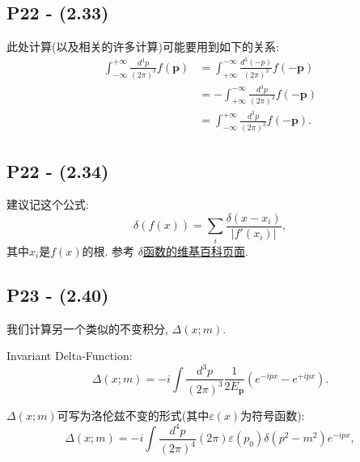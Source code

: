 \documentclass[10pt,b5paper,openany]{book}
\begin{document}
\subsection{P22 - (2.33)}

此处计算(以及相关的许多计算)可能要用到如下的关系: 
\begin{equation}
  \begin{aligned}
  \int_{-\infty}^{+\infty}\frac{d^3 p}{(2\pi)^3}f(\mathbf p) &= \int_{+\infty}^{-\infty}\frac{d^3 (-p)}{(2\pi)^3}f(-\mathbf p) \\
  &= -\int_{+\infty}^{-\infty}\frac{d^3 p}{(2\pi)^3}f(-\mathbf p) \\
  &= \int_{-\infty}^{+\infty}\frac{d^3 p}{(2\pi)^3}f(-\mathbf p).
  \end{aligned}
\end{equation}

\subsection{P22 - (2.34)}

建议记这个公式: 
\begin{equation}\label{eq: delta_on_function}
  \delta(f(x)) = \sum_i \frac{\delta(x-x_i)}{|f'(x_i)|}, 
\end{equation}
其中$x_i$是$f(x)$的根. 参考 \href{https://zh.wikipedia.org/wiki/狄拉克δ函数#與函數的復合}{$\delta$函数的维基百科页面}. 

\subsection{P23 - (2.40)} \label{subsubsec: Invar_Delta}

我们计算另一个类似的不变积分, $\Delta(x; m)$. 

Invariant Delta-Function: 
\begin{equation}
  \Delta(x; m) = -i\int\frac{d^3 p}{(2\pi)^3} \frac{1}{2E_\mathbf{p}}(e^{-ipx} - e^{+ipx}). 
\end{equation}


$\Delta(x; m)$可写为洛伦兹不变的形式(其中$\varepsilon(x)$为符号函数): 
\begin{equation}
  \Delta(x; m) = -i\int \frac{d^4 p}{(2\pi)^4}(2\pi)\varepsilon(p_0) \delta(p^2 - m^2)e^{-ipx}, 
\end{equation}
\end{document}
